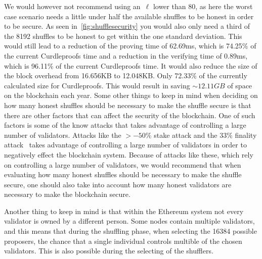 We would however not recommend using an~$\ell$ lower than 80, as here the worst case scenario needs a little under half the available shuffles to be honest in order to be secure.
As seen in~\autoref{fig:shufflesecurity} you would also only need a third of the 8192 shuffles to be honest to get within the one standard deviation.
This would still lead to a reduction of the proving time of 62.69ms, which is 74.25\% of the current Curdleproofs time and a reduction in the verifying time of 0.89ms, which is 96.11\% of the current Curdleproofs time.
It would also reduce the size of the block overhead from 16.656KB to 12.048KB.
Only 72.33\% of the currently calculated size for Curdleproofs.
This would result in saving $\sim 12.11GB$ of space on the blockchain each year.
Some other things to keep in mind when deciding on how many honest shuffles should be necessary to make the shuffle secure is that there are other factors that can affect the security of the blockchain.
One of such factors is some of the know attacks that takes advantage of controlling a large number of validators.
Attacks like the $>-50\%$ stake attack and the $33\%$ finality attack~\cite{EthereumAttackDefense2024} takes advantage of controlling a large number of validators in order to negatively effect the blockchain system.
Because of attacks like these, which rely on controlling a large number of validators, we would recommend that when evaluating how many honest shuffles should be necessary to make the shuffle secure, one should also take into account how many honest validators are necessary to make the blockchain secure.

Another thing to keep in mind is that within the Ethereum system not every validator is owned by a different person.
Some nodes contain multiple validators, and this means that during the shuffling phase, when selecting the 16384 possible proposers, the chance that a single individual controls multible of the chosen validators.
This is also possible during the selecting of the shufflers.



